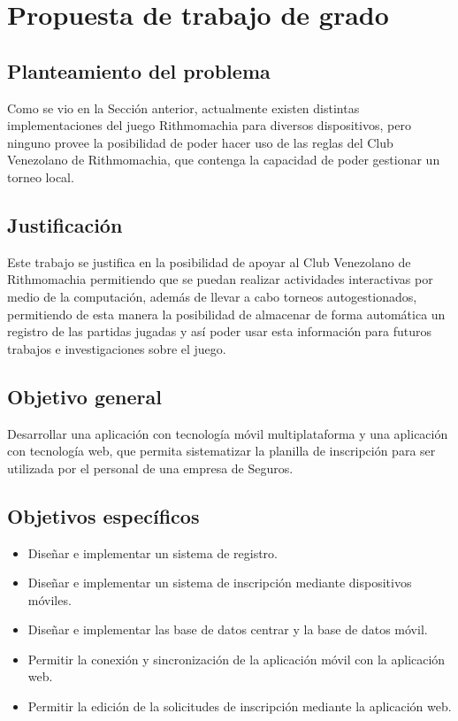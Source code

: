 \chapter{Propuesta de trabajo de grado}

\section{Planteamiento del problema}

Como se vio en la Sección anterior, actualmente existen distintas implementaciones del juego Rithmomachia para diversos dispositivos, pero ninguno provee la posibilidad de poder hacer uso de las reglas del Club Venezolano de Rithmomachia, que contenga la capacidad de poder gestionar un torneo local.

\section{Justificación}

Este trabajo se justifica en la posibilidad de apoyar al Club Venezolano de Rithmomachia permitiendo que se puedan realizar actividades interactivas por medio de la computación, además de llevar a cabo torneos autogestionados, permitiendo de esta manera la posibilidad de almacenar de forma automática un registro de las partidas jugadas y así poder usar esta información para futuros trabajos e investigaciones sobre el juego. 

\section{Objetivo general}

Desarrollar una aplicación con tecnología móvil multiplataforma y una aplicación con tecnología web, que permita sistematizar la planilla de inscripción para ser utilizada por el personal de una empresa de Seguros. 

\section{Objetivos específicos}

\begin{itemize}

	\item Diseñar e implementar un sistema de registro.
	
	\item Diseñar e implementar un sistema de inscripción mediante dispositivos móviles.
	
	\item Diseñar e implementar las base de datos centrar y la base de datos móvil.
	
	\item Permitir la conexión y sincronización de la aplicación móvil con la aplicación web.
	
	\item Permitir la edición de la solicitudes de inscripción mediante la aplicación web.
	
	

\end{itemize}


